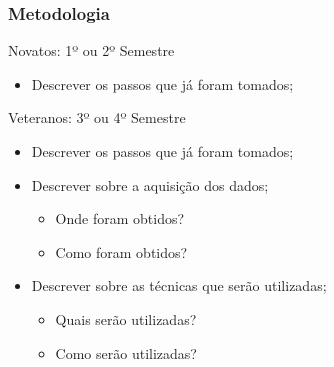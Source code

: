 \documentclass[aspectratio=169]{beamer}
\begin{document}
\begin{frame}
\frametitle{Metodologia}

\begin{block}{Novatos: 1º ou 2º Semestre}
    \begin{itemize}
        \item Descrever os passos que já foram tomados;
    \end{itemize}
\end{block}

\begin{block}{Veteranos: 3º ou 4º Semestre}
    \begin{itemize}
        \item Descrever os passos que já foram tomados;
        \item Descrever sobre a aquisição dos dados;
        \begin{itemize}
            \item Onde foram obtidos?
            \item Como foram obtidos?
        \end{itemize}
        \item Descrever sobre as técnicas que serão utilizadas;
        \begin{itemize}
            \item Quais serão utilizadas?
            \item Como serão utilizadas?
        \end{itemize}
    \end{itemize}
\end{block}

\end{frame}
\end{document}

